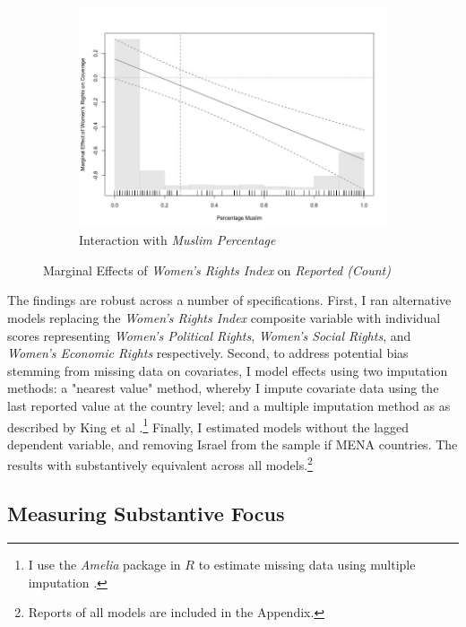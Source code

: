\documentclass[11pt, oneside]{article}
\begin{document}
\begin{figure}
\begin{subfigure}{.5\textwidth}
  \includegraphics[width=1\linewidth]{nb3}
    \caption{Interaction with \emph{Muslim Percentage}}
  \label{fig:sfig2}
\end{subfigure}
\vspace{.5cm}
\caption{Marginal Effects of \emph{Women's Rights Index} on \emph{Reported (Count)}}
\label{fig:interactions}
\end{figure}

The findings are robust across a number of specifications. First, I ran alternative models replacing the \emph{Women's Rights Index} composite variable with individual scores representing \emph{Women's Political Rights}, \emph{Women's Social Rights}, and \emph{Women's Economic Rights} respectively. Second, to address potential bias stemming from missing data on covariates, I model effects using two imputation methods: a "nearest value" method, whereby I impute covariate data using the last reported value at the country level; and a multiple imputation method as as described by King et al \citeyear{king2001}.\footnote{\hspace{5} I use the \emph{Amelia} package in $R$ to estimate missing data using multiple imputation \cite{honaker2011}.} Finally, I estimated models without the lagged dependent variable, and removing Israel from the sample if MENA countries. The results with substantively equivalent across all models.\footnote{\hspace{5}Reports of all models are included in the Appendix.}

\subsection{Measuring Substantive Focus}
\end{document}
